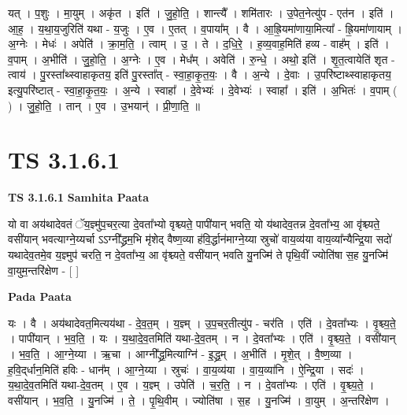 \documentclass[17pt]{extarticle}
\begin{document}
यत् । प॒शुः । मा॒युम् । अकृ॑त । इति॑ । जु॒हो॒ति॒ । शान्त्यै᳚ । शमि॑तारः । उ॒पेत॒नेत्यु॑प - एत॑न । इति॑ । आ॒ह॒ । य॒था॒य॒जुरिति॑ यथा - य॒जुः । ए॒व । ए॒तत् । व॒पाया᳚म् । वै । आ॒ह्रि॒यमा॑णाया॒मित्या᳚ - ह्रि॒यमा॑णायाम् । अ॒ग्नेः । मेधः॑ । अपेति॑ । क्रा॒म॒ति॒ । त्वाम् । उ॒ । ते । द॒धि॒रे॒ । ह॒व्य॒वाह॒मिति॑ हव्य - वाह᳚म् । इति॑ । व॒पाम् । अ॒भीति॑ । जु॒हो॒ति॒ । अ॒ग्नेः । ए॒व । मेध᳚म् । अवेति॑ । रु॒न्धे॒ । अथो॒ इति॑ । शृ॒त॒त्वायेति॑ शृत - त्वाय॑ । पु॒रस्ता᳚थ्स्वाहाकृतय॒ इति॑ पु॒रस्ता᳚त् - स्वा॒हा॒कृ॒त॒यः॒ । वै । अ॒न्ये । दे॒वाः । उ॒परि॑ष्टाथ्स्वाहाकृतय॒ इत्यु॒परि॑ष्टात् - स्वा॒हा॒कृ॒त॒यः॒ । अ॒न्ये । स्वाहा᳚ । दे॒वेभ्यः॑ । दे॒वेभ्यः॑ । स्वाहा᳚ । इति॑ । अ॒भितः॑ । व॒पाम् ( ) । जु॒हो॒ति॒ । तान् । ए॒व । उ॒भयान्॑ । प्री॒णा॒ति॒ ॥  \newline





\section{ TS 3.1.6.1 }

\textbf{TS 3.1.6.1 } \newline
\textbf{Samhita Paata} \newline

यो वा अय॑थादेवतं ॅय॒ज्ञ्मु॑प॒चर॒त्या दे॒वता᳚भ्यो वृश्च्यते॒ पापी॑यान् भवति॒ यो य॑थादेव॒तन्न दे॒वता᳚भ्य॒ आ वृ॑श्च्यते॒ वसी॑यान् भवत्याग्ने॒य्यर्चा ऽऽग्नी᳚द्ध्रम॒भि मृ॑शेद् वैष्ण॒व्या ह॑वि॒र्द्धान॑माग्ने॒य्या स्रुचो॑ वाय॒व्य॑या वाय॒व्या᳚न्यैन्द्रि॒या सदो॑ यथादेव॒तमे॒व य॒ज्ञ्मुप॑ चरति॒ न दे॒वता᳚भ्य॒ आ वृ॑श्च्यते॒ वसी॑यान् भवति यु॒नज्मि॑ ते पृथि॒वीं ज्योति॑षा स॒ह यु॒नज्मि॑ वा॒युम॒न्तरि॑क्षेण - [  ] \newline

\textbf{Pada Paata} \newline

यः । वै । अय॑थादेवत॒मित्यय॑था - दे॒व॒त॒म् । य॒ज्ञ्म् । उ॒प॒चर॒तीत्यु॑प - चर॑ति । एति॑ । दे॒वता᳚भ्यः । वृ॒श्च्य॒ते॒ । पापी॑यान् । भ॒व॒ति॒ । यः । य॒था॒दे॒व॒तमिति॑ यथा-दे॒व॒तम् । न । दे॒वता᳚भ्यः । एति॑ । वृ॒श्च्य॒ते॒ । वसी॑यान् । भ॒व॒ति॒ । आ॒ग्ने॒य्या । ऋ॒चा । आग्नी᳚द्ध्र॒मित्याग्नि॑ - इ॒द्ध्र॒म् । अ॒भीति॑ । मृ॒शे॒त् । वै॒ष्ण॒व्या । ह॒वि॒द्‌र्धान॒मिति॑ हविः - धान᳚म् । आ॒ग्ने॒य्या । स्रुचः॑ । वा॒य॒व्य॑या । वा॒य॒व्या॑नि । ऐ॒न्द्रि॒या । सदः॑ । य॒था॒दे॒व॒तमिति॑ यथा-दे॒व॒तम् । ए॒व । य॒ज्ञ्म् । उपेति॑ । च॒र॒ति॒ । न । दे॒वता᳚भ्यः । एति॑ । वृ॒श्च्य॒ते॒ । वसी॑यान् । भ॒व॒ति॒ । यु॒नज्मि॑ । ते॒ । पृ॒थि॒वीम् । ज्योति॑षा । स॒ह । यु॒नज्मि॑ । वा॒युम् । अ॒न्तरि॑क्षेण ।  \newline
\end{document}
